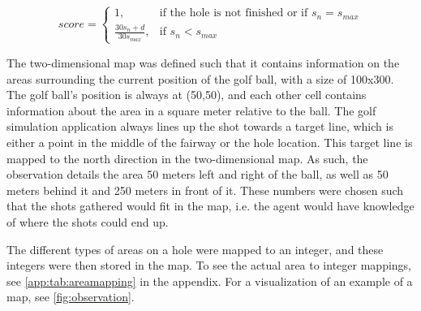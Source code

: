 \documentclass{kththesis}
\begin{document}
\begin{equation}
\label{eq:agentscore}
score = 
\begin{cases}
1,& \text{if the hole is not finished or if } s_n = s_{max}\\
\frac{30s_n + d}{30s_{max}},& \text{if } s_n < s_{max}
\end{cases}
\end{equation}

The two-dimensional map was defined such that it contains information on the areas surrounding the current position of the golf ball, with a size of 100x300. The golf ball's position is always at (50,50), and each other cell contains information about the area in a square meter relative to the ball. The golf simulation application always lines up the shot towards a target line, which is either a point in the middle of the fairway or the hole location. This target line is mapped to the north direction in the two-dimensional map. As such, the observation details the area 50 meters left and right of the ball, as well as 50 meters behind it and 250 meters in front of it. These numbers were chosen such that the shots gathered would fit in the map, i.e. the agent would have knowledge of where the shots could end up. 

The different types of areas on a hole were mapped to an integer, and these integers were then stored in the map. To see the actual area to integer mappings, see \autoref{app:tab:areamapping} in the appendix. For a visualization of an example of a map, see \autoref{fig:observation}.
\end{document}
